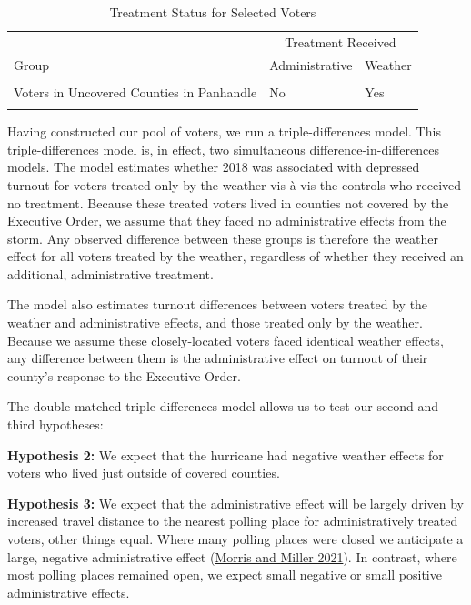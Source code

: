 \documentclass[
  12pt,
]{article}
\begin{document}
\begin{singlespace}
\begin{table}[H]

\caption{\label{tab:groups-treat}\label{tab:groups} Treatment Status for Selected Voters}
\centering
\begin{tabular}[t]{lll}
\toprule
\multicolumn{1}{c}{ } & \multicolumn{2}{c}{Treatment Received} \\
\cmidrule(l{3pt}r{3pt}){2-3}
Group & Administrative & Weather\\
\midrule
\cellcolor{gray!6}{Voters in Covered Counties} & \cellcolor{gray!6}{Yes} & \cellcolor{gray!6}{Yes}\\
Voters in Uncovered Counties in Panhandle & No & Yes\\
\cellcolor{gray!6}{Voters Elsewhere} & \cellcolor{gray!6}{No} & \cellcolor{gray!6}{No}\\
\bottomrule
\end{tabular}
\end{table}
\end{singlespace}

Having constructed our pool of voters, we run a triple-differences model. This triple-differences model is, in effect, two simultaneous difference-in-differences models. The model estimates whether 2018 was associated with depressed turnout for voters treated only by the weather vis-à-vis the controls who received no treatment. Because these treated voters lived in counties not covered by the Executive Order, we assume that they faced no administrative effects from the storm. Any observed difference between these groups is therefore the weather effect for all voters treated by the weather, regardless of whether they received an additional, administrative treatment.

The model also estimates turnout differences between voters treated by the weather and administrative effects, and those treated only by the weather. Because we assume these closely-located voters faced identical weather effects, any difference between them is the administrative effect on turnout of their county's response to the Executive Order.

The double-matched triple-differences model allows us to test our second and third hypotheses:

\textbf{Hypothesis 2:} We expect that the hurricane had negative weather effects for voters who lived just outside of covered counties.

\textbf{Hypothesis 3:} We expect that the administrative effect will be largely driven by increased travel distance to the nearest polling place for administratively treated voters, other things equal. Where many polling places were closed we anticipate a large, negative administrative effect (\protect\hyperlink{ref-Morris2021}{Morris and Miller 2021}). In contrast, where most polling places remained open, we expect small negative or small positive administrative effects.
\end{document}
